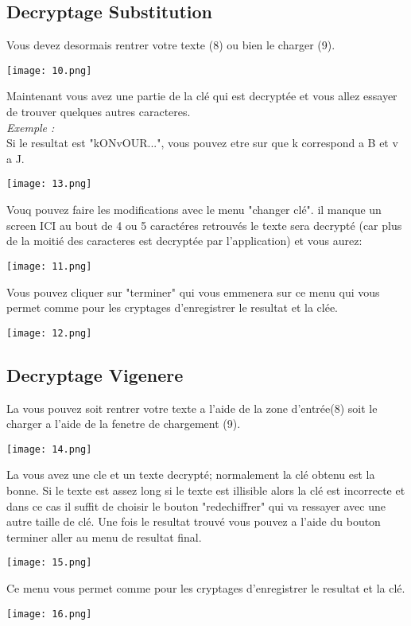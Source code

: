 \documentclass[a4]{article}
\begin{document}
		\subsection{Decryptage Substitution}
			Vous devez desormais rentrer votre texte (8) ou bien le charger (9).
			\begin{center}\texttt{[image: 10.png]}\end{center}
			Maintenant vous avez une partie de la clé qui est decryptée et vous allez 
			essayer de trouver quelques autres caracteres. \\
			\textit{Exemple :}\\
			Si le resultat est "kONvOUR...", vous pouvez etre sur que k correspond a B et v a J. 
			\begin{center}\texttt{[image: 13.png]}\end{center}
			Vouq pouvez faire les modifications avec le menu "changer clé". 
			il manque un screen ICI
			au bout de 4 ou 5 caractéres retrouvés le texte sera decrypté (car plus de la moitié 
			des caracteres est decryptée par l'application) et vous aurez:
			\begin{center}\texttt{[image: 11.png]}\end{center}
			Vous pouvez cliquer sur "terminer" qui vous emmenera sur ce menu qui vous permet comme pour 
			les cryptages d'enregistrer le resultat et la clée.
			\begin{center}\texttt{[image: 12.png]}\end{center}
		\subsection{Decryptage Vigenere}
			La vous pouvez soit rentrer votre texte a l'aide de la zone d'entrée(8)
			soit le charger a l'aide de la fenetre de chargement (9).
			\begin{center}\texttt{[image: 14.png]}\end{center}
			La vous avez une cle et un texte decrypté; normalement la clé obtenu est la bonne.
			Si le texte est assez long si le texte est illisible alors la clé est incorrecte et
			 dans ce cas il suffit de choisir le bouton "redechiffrer" qui va ressayer avec une 
			 autre taille de clé. Une fois le resultat trouvé vous pouvez a l'aide du bouton 
			 terminer aller au menu de resultat final.  
			\begin{center}\texttt{[image: 15.png]}\end{center}
			Ce menu vous permet comme pour 
			les cryptages d'enregistrer le resultat et la clé.
			\begin{center}\texttt{[image: 16.png]}\end{center}
		
\end{document}
